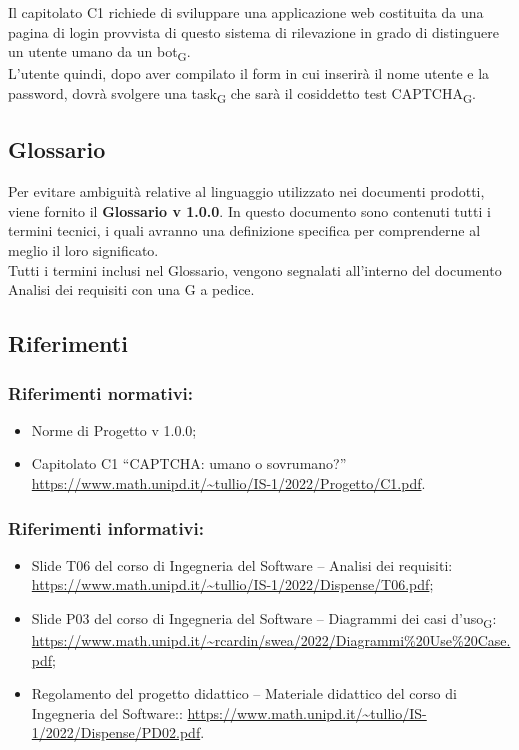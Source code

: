 Il capitolato C1 richiede di sviluppare una applicazione web costituita da una pagina di login provvista di questo sistema di rilevazione in grado di distinguere un utente umano da un bot\textsubscript{G}.\\
L'utente quindi, dopo aver compilato il form in cui inserirà il nome utente e la password, dovrà svolgere una task\textsubscript{G} che sarà il cosiddetto test CAPTCHA\textsubscript{G}.



\subsection{Glossario}
Per evitare ambiguità relative al linguaggio utilizzato nei documenti prodotti, viene fornito il \textbf{Glossario v 1.0.0}. In questo documento sono contenuti tutti i termini tecnici, i quali avranno una definizione specifica per comprenderne al meglio il loro significato.\\
Tutti i termini inclusi nel Glossario, vengono segnalati all'interno del documento Analisi dei requisiti con una G a pedice.

\subsection{Riferimenti}

\subsubsection{Riferimenti normativi:}\:
\begin{itemize}
	\item Norme di Progetto v 1.0.0;
	\item Capitolato C1 “CAPTCHA: umano o sovrumano?”
		\url{https://www.math.unipd.it/~tullio/IS-1/2022/Progetto/C1.pdf}.
\end{itemize}

\subsubsection{Riferimenti informativi:}\:
\begin{itemize}
	\item Slide T06 del corso di Ingegneria del Software – Analisi dei requisiti:
		\url{https://www.math.unipd.it/~tullio/IS-1/2022/Dispense/T06.pdf};
	\item Slide P03 del corso di Ingegneria del Software – Diagrammi dei casi d'uso\textsubscript{G}:
		\url{https://www.math.unipd.it/~rcardin/swea/2022/Diagrammi%20Use%20Case.pdf};
	\item Regolamento del progetto didattico – Materiale didattico del corso di Ingegneria del Software::
		\url{https://www.math.unipd.it/~tullio/IS-1/2022/Dispense/PD02.pdf}.
\end{itemize}
